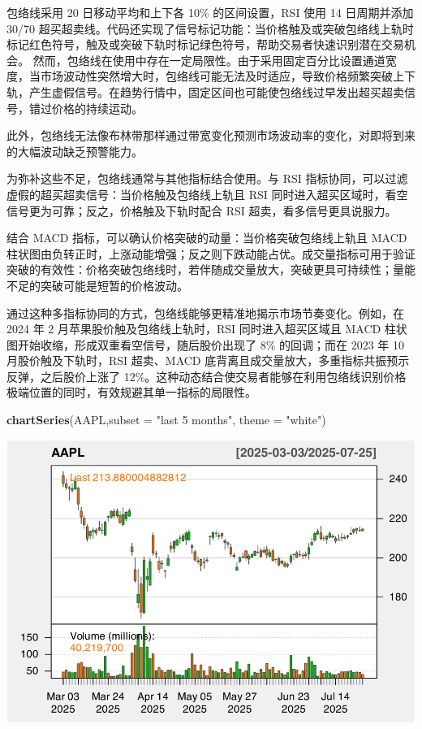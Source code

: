 \documentclass[]{ctexbook}
\newenvironment{Shaded}{\begin{snugshade}}{\end{snugshade}}
\newcommand{\AttributeTok}[1]{\textcolor[rgb]{0.13,0.29,0.53}{#1}}
\newcommand{\FunctionTok}[1]{\textcolor[rgb]{0.13,0.29,0.53}{\textbf{#1}}}
\newcommand{\NormalTok}[1]{#1}
\newcommand{\StringTok}[1]{\textcolor[rgb]{0.31,0.60,0.02}{#1}}
\begin{document}
包络线采用 20 日移动平均和上下各 10\% 的区间设置，RSI 使用 14 日周期并添加 30/70 超买超卖线。代码还实现了信号标记功能：当价格触及或突破包络线上轨时标记红色符号，触及或突破下轨时标记绿色符号，帮助交易者快速识别潜在交易机会。
然而，包络线在使用中存在一定局限性。由于采用固定百分比设置通道宽度，当市场波动性突然增大时，包络线可能无法及时适应，导致价格频繁突破上下轨，产生虚假信号。在趋势行情中，固定区间也可能使包络线过早发出超买超卖信号，错过价格的持续运动。

此外，包络线无法像布林带那样通过带宽变化预测市场波动率的变化，对即将到来的大幅波动缺乏预警能力。

为弥补这些不足，包络线通常与其他指标结合使用。与 RSI 指标协同，可以过滤虚假的超买超卖信号：当价格触及包络线上轨且 RSI 同时进入超买区域时，看空信号更为可靠；反之，价格触及下轨时配合 RSI 超卖，看多信号更具说服力。

结合 MACD 指标，可以确认价格突破的动量：当价格突破包络线上轨且 MACD 柱状图由负转正时，上涨动能增强；反之则下跌动能占优。成交量指标可用于验证突破的有效性：价格突破包络线时，若伴随成交量放大，突破更具可持续性；量能不足的突破可能是短暂的价格波动。

通过这种多指标协同的方式，包络线能够更精准地揭示市场节奏变化。例如，在 2024 年 2 月苹果股价触及包络线上轨时，RSI 同时进入超买区域且 MACD 柱状图开始收缩，形成双重看空信号，随后股价出现了 8\% 的回调；而在 2023 年 10 月股价触及下轨时，RSI 超卖、MACD 底背离且成交量放大，多重指标共振预示反弹，之后股价上涨了 12\%。这种动态结合使交易者能够在利用包络线识别价格极端位置的同时，有效规避其单一指标的局限性。

\begin{Shaded}
\begin{Highlighting}[]
\FunctionTok{chartSeries}\NormalTok{(AAPL,}\AttributeTok{subset =} \StringTok{"last 5 months"}\NormalTok{, }\AttributeTok{theme =} \StringTok{"white"}\NormalTok{)}
\end{Highlighting}
\end{Shaded}

\includegraphics[width=0.9\linewidth]{QuantmodHandbook_files/figure-latex/envol_2-1}
\end{document}
